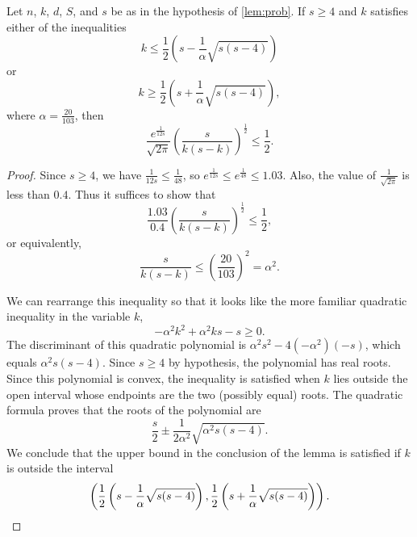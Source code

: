 \documentclass{article}
\begin{document}
\begin{lemma}\label{lem:quad}
  Let $n$, $k$, $d$, $S$, and $s$ be as in the hypothesis of \autoref{lem:prob}.
  If $s \geq 4$ and $k$ satisfies either of the inequalities
  \begin{equation*}
    k \leq \frac{1}{2}\left(s - \frac{1}{\alpha} \sqrt{s (s - 4)}\right)
  \end{equation*}
  or
  \begin{equation*}
    k \geq \frac{1}{2}\left(s + \frac{1}{\alpha} \sqrt{s (s - 4)}\right),
  \end{equation*}
  where $\alpha = \frac{20}{103}$, then
  \begin{equation*}
    \frac{e^{\frac{1}{12s}}}{\sqrt{2 \pi}} \left(\frac{s}{k (s - k)}\right)^{\frac{1}{2}} \leq \frac{1}{2}.
  \end{equation*}
\end{lemma}
\begin{proof}
  Since $s \geq 4$, we have $\frac{1}{12 s} \leq \frac{1}{48}$, so $e^\frac{1}{12 s} \leq e^{\frac{1}{48}} \leq 1.03$.
  Also, the value of $\frac{1}{\sqrt{2 \pi}}$ is less than $0.4$.
  Thus it suffices to show that
  \begin{equation*}
    \frac{1.03}{0.4} \left(\frac{s}{k (s - k)}\right)^{\frac{1}{2}} \leq \frac{1}{2},
  \end{equation*}
  or equivalently,
  \begin{equation*}
    \frac{s}{k (s - k)} \leq \left(\frac{20}{103}\right)^2 = \alpha^2.
  \end{equation*}

  We can rearrange this inequality so that it looks like the more familiar quadratic inequality in the variable $k$,
  \begin{equation*}
    -\alpha^2 k^2 + \alpha^2 k s - s \geq 0.
  \end{equation*}
  The discriminant of this quadratic polynomial is $\alpha^2 s^2 - 4(-\alpha^2)(-s)$, which equals $\alpha^2 s (s - 4)$.
  Since $s \geq 4$ by hypothesis, the polynomial has real roots.
  Since this polynomial is convex, the inequality is satisfied when $k$ lies outside the open interval whose endpoints are the two (possibly equal) roots.
  The quadratic formula proves that the roots of the polynomial are
  \begin{equation*}
    \frac{s}{2} \pm \frac{1}{2 \alpha^2} \sqrt{\alpha^2 s (s - 4)}.
  \end{equation*}
  We conclude that the upper bound in the conclusion of the lemma is satisfied if $k$ is outside the interval
  \begin{equation*}
    \left(\frac{1}{2}\left(s - \frac{1}{\alpha} \sqrt{s (s - 4)}\right), \frac{1}{2}\left(s + \frac{1}{\alpha} \sqrt{s (s - 4)}\right)\right). \qedhere
  \end{equation*}
\end{proof}
\end{document}
